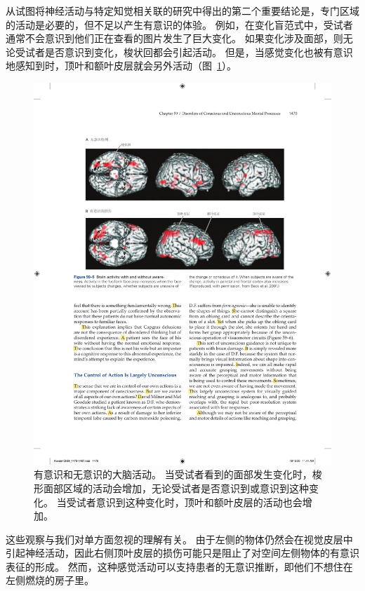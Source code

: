从试图将神经活动与特定知觉相关联的研究中得出的第二个重要结论是，专门区域的活动是必要的，但不足以产生有意识的体验。
例如，在变化盲范式中，受试者通常不会意识到他们正在查看的图片发生了巨大变化。
如果变化涉及面部，则无论受试者是否意识到变化，梭状回都会引起活动。
但是，当感觉变化也被有意识地感知到时，顶叶和额叶皮层就会另外活动（图~\ref{fig:59_5}）。


\begin{figure}[htbp]
	\centering
	\includegraphics[width=1.0\linewidth]{chap59/fig_59_5}
	\caption{有意识和无意识的大脑活动。
		当受试者看到的面部发生变化时，梭形面部区域的活动会增加，无论受试者是否意识到或意识到这种变化。
		当受试者意识到这种变化时，顶叶和额叶皮层的活动也会增加\cite{beck2001neural}。}
	\label{fig:59_5}
\end{figure}


这些观察与我们对单方面忽视的理解有关。
由于左侧的物体仍然会在视觉皮层中引起神经活动，因此右侧顶叶皮层的损伤可能只是阻止了对空间左侧物体的有意识表征的形成。
然而，这种感觉活动可以支持患者的无意识推断，即他们不想住在左侧燃烧的房子里。


